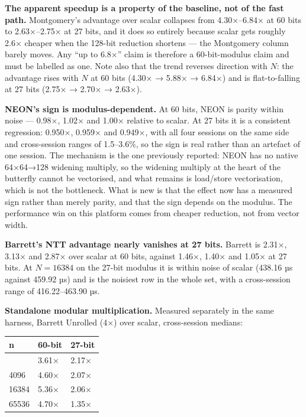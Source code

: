 \textbf{The apparent speedup is a property of the baseline, not of the fast path.} Montgomery's advantage over scalar collapses from 4.30×--6.84× at 60 bits to 2.63×--2.75× at 27 bits, and it does so entirely because scalar gets roughly 2.6× cheaper when the 128-bit reduction shortens --- the Montgomery column barely moves. Any ``up to 6.8×'' claim is therefore a 60-bit-modulus claim and must be labelled as one. Note also that the trend reverses direction with \(N\): the advantage rises with \(N\) at 60 bits (4.30× → 5.88× → 6.84×) and is flat-to-falling at 27 bits (2.75× → 2.70× → 2.63×).

\textbf{NEON's sign is modulus-dependent.} At 60 bits, NEON is parity within noise --- 0.98×, 1.02× and 1.00× relative to scalar. At 27 bits it is a consistent regression: 0.950×, 0.959× and 0.949×, with all four sessions on the same side and cross-session ranges of 1.5--3.6\%, so the sign is real rather than an artefact of one session. The mechanism is the one previously reported: NEON has no native 64×64→128 widening multiply, so the widening multiply at the heart of the butterfly cannot be vectorised, and what remains is load/store vectorisation, which is not the bottleneck. What is new is that the effect now has a measured sign rather than merely parity, and that the sign depends on the modulus. The performance win on this platform comes from cheaper reduction, not from vector width.

\textbf{Barrett's NTT advantage nearly vanishes at 27 bits.} Barrett is 2.31×, 3.13× and 2.87× over scalar at 60 bits, against 1.46×, 1.40× and 1.05× at 27 bits. At \(N = 16384\) on the 27-bit modulus it is within noise of scalar (438.16 µs against 459.92 µs) and is the noisiest row in the whole set, with a cross-session range of 416.22--463.90 µs.

\textbf{Standalone modular multiplication.} Measured separately in the same harness, Barrett Unrolled (4×) over scalar, cross-session medians:

{\def\LTcaptype{none} %
\begin{longtable}[]{@{}lll@{}}
\toprule\noalign{}
n & 60-bit & 27-bit \\
\midrule\noalign{}
\endhead
\bottomrule\noalign{}
\endlastfoot
1024 & 3.61× & 2.17× \\
4096 & 4.60× & 2.07× \\
16384 & 5.36× & 2.06× \\
65536 & 4.70× & 1.35× \\
\end{longtable}
}

